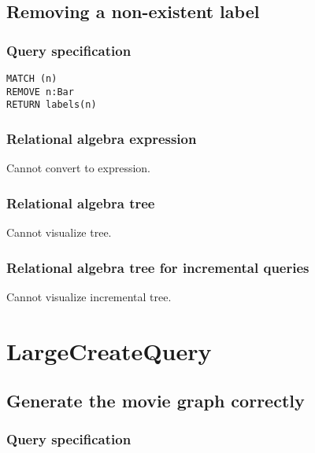 \subsection{Removing a non-existent label}

\subsubsection*{Query specification}

\begin{lstlisting}
MATCH (n)
REMOVE n:Bar
RETURN labels(n)
\end{lstlisting}

\subsubsection*{Relational algebra expression}

Cannot convert to expression.

\subsubsection*{Relational algebra tree}

Cannot visualize tree.

\subsubsection*{Relational algebra tree for incremental queries}

Cannot visualize incremental tree.

\section{LargeCreateQuery}

\subsection{Generate the movie graph correctly}

\subsubsection*{Query specification}

